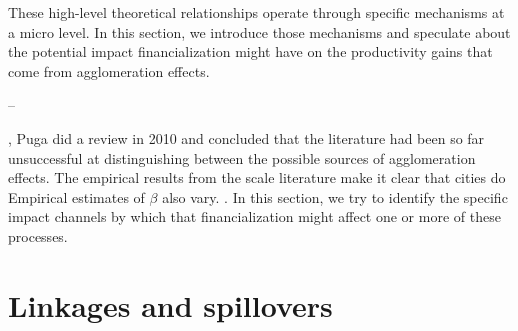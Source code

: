 \documentclass[a4paper]{article}
\theoremstyle{definition}
\theoremstyle{plain}
\begin{document}
{These high-level theoretical relationships operate through specific mechanisms at a micro level. In this section, we introduce those mechanisms and speculate about the potential impact financialization might have on the productivity gains that come from agglomeration effects.

--


, Puga \cite{pugaMagnitudeCausesAgglomeration2010} did a review in 2010 and concluded that the literature had been so far unsuccessful at distinguishing between the possible sources of agglomeration effects. %
The empirical results from the scale literature  make it clear that cities do  
Empirical estimates of $\beta$ also vary. \cite{rosenthalEvidenceNatureSources2004, bettencourtIntroductionUrbanScience2021, loboUrbanScalingProduction2013}. 
 In this section,  we try to identify the specific impact channels by which that financialization might affect one or more of these processes. 
\section{Linkages and spillovers}

}

\end{document}
